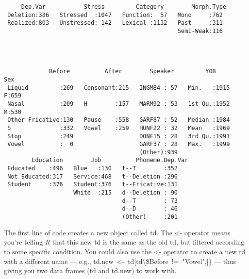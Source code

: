 \documentclass[
  12pt,
  letterpaper]{article}
\newenvironment{Shaded}{\begin{snugshade}}{\end{snugshade}}
\newcommand{\FunctionTok}[1]{\textcolor[rgb]{0.28,0.35,0.67}{#1}}
\newcommand{\NormalTok}[1]{\textcolor[rgb]{0.00,0.23,0.31}{#1}}
\newcommand{\OtherTok}[1]{\textcolor[rgb]{0.00,0.23,0.31}{#1}}
\newcommand{\SpecialCharTok}[1]{\textcolor[rgb]{0.37,0.37,0.37}{#1}}
\newcommand{\StringTok}[1]{\textcolor[rgb]{0.13,0.47,0.30}{#1}}
\renewcommand\texttt[1]{{\ttfamily\color{BrickRed}#1}}
\begin{document}
\begin{Shaded}
\end{Shaded}

\begin{verbatim}
     Dep.Var           Stress         Category        Morph.Type 
 Deletion:386   Stressed  :1047   Function:  57   Mono     :762  
 Realized:803   Unstressed: 142   Lexical :1132   Past     :311  
                                                  Semi-Weak:116  
                                                                 
                                                                 
                                                                 
                                                                 
             Before          After        Speaker         YOB       Sex    
 Liquid         :269   Consonant:215   INGM84 : 57   Min.   :1915   F:659  
 Nasal          :209   H        :157   MARM92 : 53   1st Qu.:1952   M:530  
 Other Fricative:130   Pause    :558   GARF87 : 52   Median :1984          
 S              :332   Vowel    :259   HUNF22 : 32   Mean   :1969          
 Stop           :249                   DONF15 : 28   3rd Qu.:1991          
 Vowel          :  0                   GARF37 : 28   Max.   :1999          
                                       (Other):939                         
        Education        Job          Phoneme.Dep.Var
 Educated    :496   Blue   :130   t--T        :352   
 Not Educated:317   Service:468   t--Deletion :296   
 Student     :376   Student:376   t--Fricative:131   
                    White  :215   d--Deletion : 90   
                                  d--T        : 73   
                                  d--D        : 46   
                                  (Other)     :201   
\end{verbatim}

The first line of code creates a new object called \texttt{td}. The
\texttt{\textless{}-} operator means you're telling \emph{R} that this
new \texttt{td} is the same as the old \texttt{td}, but filtered
according to some specific condition. You could also use the
\texttt{\textless{}-} operator to create a new \texttt{td} with a
different name --- e.g.,
\texttt{td.new\ \textless{}-\ td{[}td\textbackslash{}\$Before\ !=\ "Vowel",{]}\}}
--- thus giving you two data frames (\texttt{td} and \texttt{td.new}) to
work with.
\end{document}
